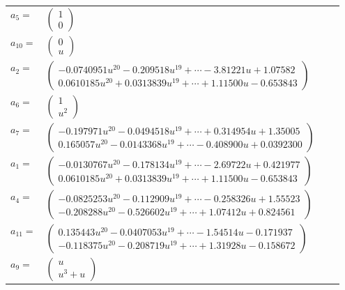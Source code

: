 \documentclass[1p]{elsarticle_modified}
\theoremstyle{definition}
\begin{document}
\begin{tabular}{m{7pt} m{180pt} m{7pt} m{180pt} }
\flushright $a_{5}=$&$\begin{pmatrix}1\\0\end{pmatrix}$ \\
\flushright $a_{10}=$&$\begin{pmatrix}0\\u\end{pmatrix}$ \\
\flushright $a_{2}=$&$\begin{pmatrix}-0.0740951 u^{20}-0.209518 u^{19}+\cdots-3.81221 u+1.07582\\0.0610185 u^{20}+0.0313839 u^{19}+\cdots+1.11500 u-0.653843\end{pmatrix}$ \\
\flushright $a_{6}=$&$\begin{pmatrix}1\\u^2\end{pmatrix}$ \\
\flushright $a_{7}=$&$\begin{pmatrix}-0.197971 u^{20}-0.0494518 u^{19}+\cdots+0.314954 u+1.35005\\0.165057 u^{20}-0.0143368 u^{19}+\cdots-0.408900 u+0.0392300\end{pmatrix}$ \\
\flushright $a_{1}=$&$\begin{pmatrix}-0.0130767 u^{20}-0.178134 u^{19}+\cdots-2.69722 u+0.421977\\0.0610185 u^{20}+0.0313839 u^{19}+\cdots+1.11500 u-0.653843\end{pmatrix}$ \\
\flushright $a_{4}=$&$\begin{pmatrix}-0.0825253 u^{20}-0.112909 u^{19}+\cdots-0.258326 u+1.55523\\-0.208288 u^{20}-0.526602 u^{19}+\cdots+1.07412 u+0.824561\end{pmatrix}$ \\
\flushright $a_{11}=$&$\begin{pmatrix}0.135443 u^{20}-0.0407053 u^{19}+\cdots-1.54514 u-0.171937\\-0.118375 u^{20}-0.208719 u^{19}+\cdots+1.31928 u-0.158672\end{pmatrix}$ \\
\flushright $a_{9}=$&$\begin{pmatrix}u\\u^3+u\end{pmatrix}$ \\

\end{tabular}
\end{document}
